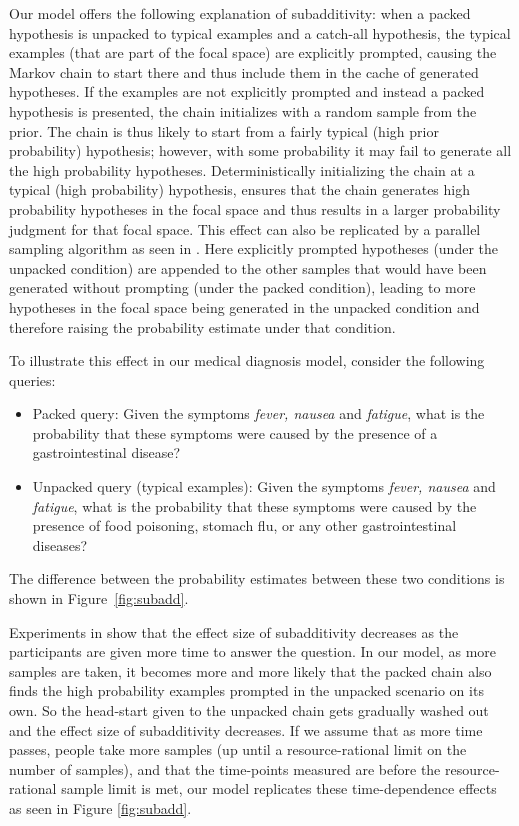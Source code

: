 Our model offers the following explanation of subadditivity: when a packed hypothesis is unpacked to typical examples and a catch-all hypothesis, the typical examples (that are part of the focal space) are explicitly prompted, causing the Markov chain to start there and thus include them in the cache of generated hypotheses.
If the examples are not explicitly prompted and instead a packed hypothesis is presented, the chain initializes with a random sample from the prior. The chain is thus likely to start from a fairly typical (high prior probability) hypothesis; however, with some probability it may fail to generate all the high probability hypotheses. Deterministically initializing the chain at a typical (high probability) hypothesis, ensures that the chain generates high probability hypotheses in the focal space and thus results in a larger probability judgment for that focal space.
This effect can also be replicated by a parallel sampling algorithm as seen in \citet{Thomas2008}. Here explicitly prompted hypotheses (under the unpacked condition) are appended to the other samples that would have been generated without prompting (under the packed condition), leading to more hypotheses in the focal space being generated in the unpacked condition and therefore raising the probability estimate under that condition.

To illustrate this effect in our medical diagnosis model, consider the following queries: 
\begin{itemize}
\item Packed query: Given the symptoms \emph{fever, nausea} and \emph{fatigue}, what is the probability that these symptoms were caused by the presence of a gastrointestinal disease? 
\item Unpacked query (typical examples): Given the symptoms \emph{fever, nausea} and \emph{fatigue}, what is the probability that these symptoms were caused by the presence of food poisoning, stomach flu, or any other gastrointestinal diseases?
\end{itemize}
The difference between the probability estimates between these two conditions is shown in Figure~\ref{fig:subadd}.

Experiments in \citet{Dougherty2003} show that the effect size of subadditivity decreases as the participants are given more time to answer the question. In our model, as more samples are taken, it becomes more and more likely that the packed chain also finds the high probability examples prompted in the unpacked scenario on its own. So the head-start given to the unpacked chain gets gradually washed out and the effect size of subadditivity decreases. If we assume that as more time passes, people take more samples (up until a resource-rational limit on the number of samples), and that the time-points measured are before the resource-rational sample limit is met, our model replicates these time-dependence effects as seen in Figure \ref{fig:subadd}.

